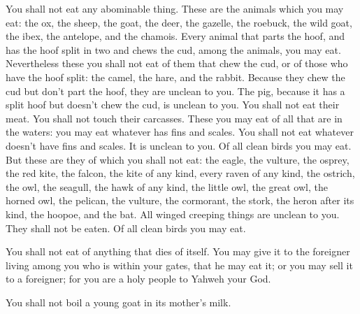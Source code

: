  You shall not eat any abominable thing. 
These are the animals which you may eat: the ox, the sheep, the goat,
 the deer, the gazelle, the roebuck, the wild goat, the
ibex, the antelope, and the chamois.  Every animal that
parts the hoof, and has the hoof split in two and chews the cud, among
the animals, you may eat.  Nevertheless these you shall
not eat of them that chew the cud, or of those who have the hoof split:
the camel, the hare, and the rabbit. Because they chew the cud but don't
part the hoof, they are unclean to you.  The pig, because
it has a split hoof but doesn't chew the cud, is unclean to you. You
shall not eat their meat. You shall not touch their carcasses.
 These you may eat of all that are in the waters: you may
eat whatever has fins and scales.  You shall not eat
whatever doesn't have fins and scales. It is unclean to you.
 Of all clean birds you may eat.  But
these are they of which you shall not eat: the eagle, the vulture, the
osprey,  the red kite, the falcon, the kite of any kind,
 every raven of any kind,  the ostrich,
the owl, the seagull, the hawk of any kind,  the little
owl, the great owl, the horned owl,  the pelican, the
vulture, the cormorant,  the stork, the heron after its
kind, the hoopoe, and the bat.  All winged creeping
things are unclean to you. They shall not be eaten.  Of
all clean birds you may eat.

 You shall not eat of anything that dies of itself. You
may give it to the foreigner living among you who is within your gates,
that he may eat it; or you may sell it to a foreigner; for you are a
holy people to Yahweh your God.

You shall not boil a young goat in its mother's milk.


